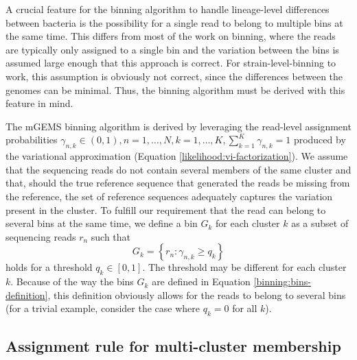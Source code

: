 \documentclass[officiallayout]{tktla}
\begin{document}
A crucial feature for the binning algorithm to handle lineage-level
differences between bacteria is the possibility for a single read to
belong to multiple bins at the same time. This differs from most of
the work on binning, where the reads are typically only assigned to a
single bin and the variation between the bins is assumed large enough
that this approach is correct. For strain-level-binning to work, this
assumption is obviously not correct, since the differences between the
genomes can be minimal. Thus, the binning algorithm must be derived
with this feature in mind.

The mGEMS binning algorithm is derived by leveraging the read-level
assignment probabilities $\gamma_{n, k} \in \left(0, 1\right), n = 1,
\dots, N, k = 1, \dots, K, \sum_{k = 1}^{K}\gamma_{n, k} = 1$ produced
by the variational approximation (Equation
\ref{likelihood:vi-factorization}). We assume that the sequencing
reads do not contain several members of the same cluster and that,
should the true reference sequence that generated the reads be missing
from the reference, the set of reference sequences adequately captures
the variation present in the cluster. To fulfill our requirement that
the read can belong to several bins at the same time, we define a bin
$G_{k}$ for each cluster $k$ as a subset of sequencing reads $r_{n}$
such that
\begin{equation}
  \label{binning:bins-definition}
  G_{k} = \left\{r_{n} : \gamma_{n, k} \geq q_{k}\right\}
\end{equation}
holds for a threshold $q_{k} \in \left[0, 1\right]$. The threshold may
be different for each cluster $k$. Because of the way the bins $G_{k}$
are defined in Equation \ref{binning:bins-definition}, this definition
obviously allows for the reads to belong to several bins (for a
trivial example, consider the case where $q_{k} = 0$ for all $k$).

\subsection{Assignment rule for multi-cluster membership}
\end{document}
